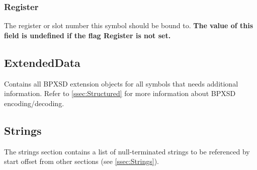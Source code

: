 \subsubsection{Register}
The register or slot number this symbol should be bound to.\newline
\textbf{The value of this field is undefined if the flag Register is not set.}

\subsection{ExtendedData}
Contains all BPXSD extension objects for all symbols that needs additional information.\newline
Refer to \ref{ssec:Structured} for more information about BPXSD encoding/decoding.

\subsection{Strings}
The strings section contains a list of null-terminated strings to be referenced by start offset from other sections (see \ref{ssec:Strings}).